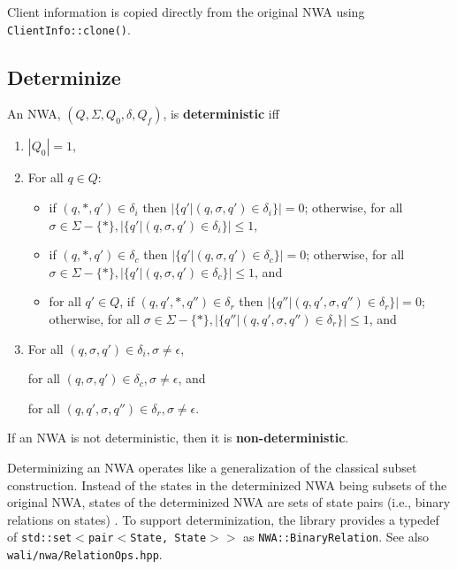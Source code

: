 Client
information is copied directly from the original NWA using
\texttt{ClientInfo::clone()}.

\subsection{Determinize}
\label{Se:Determinize}

\begin{definition}
An NWA, $(Q,\Sigma,Q_0,\delta,Q_f)$, is \textbf{deterministic} iff 

\begin{enumerate} 

\item $|Q_0| = 1$, 

\item For all $q \in Q$: 
  \begin{itemize}
    \item if $(q,*,q') \in \delta_i$ then $|\{q'|(q,\sigma,q') \in
      \delta_i\}| = 0$; otherwise, for all $\sigma \in \Sigma - \{*\},
      |\{q'|(q,\sigma,q') \in \delta_i\}| \leq 1$,

    \item if $(q,*,q') \in \delta_c$ then $ |\{q'|(q,\sigma,q') \in
      \delta_c\}| = 0$; otherwise, for all $\sigma \in \Sigma - \{*\},
      |\{q'|(q,\sigma,q') \in \delta_c\}| \leq 1$, and

    \item for all $q' \in Q$, if $(q,q',*,q'') \in \delta_r$ then
      $|\{q''|(q,q',\sigma,q'') \in \delta_r\}| = 0$; otherwise, for all
      $\sigma \in \Sigma - \{*\}, |\{q''|(q,q',\sigma,q'') \in \delta_r\}|
      \leq 1$, and
  \end{itemize}
\item For all $(q,\sigma,q') \in \delta_i, \sigma \neq \epsilon$,

 for all $(q,\sigma,q') \in \delta_c, \sigma \neq \epsilon$,  and 

 for all $(q,q',\sigma,q'') \in \delta_r, \sigma \neq \epsilon$.\\

\end{enumerate}

If an NWA is not deterministic, then it is \textbf{non-deterministic}.
\end{definition}

Determinizing an NWA operates like a
generalization of the classical subset construction.  Instead of the states
in the determinized NWA being subsets of the original NWA, states of the
determinized NWA are sets of state pairs (i.e., binary relations on states)
\cite{JACM:AM2009}.  To support determinization, the library provides a
typedef of \texttt{std::set$<$pair$<$State, State$>>$} as 
\texttt{NWA::BinaryRelation}. See also \texttt{wali/nwa/RelationOps.hpp}.


